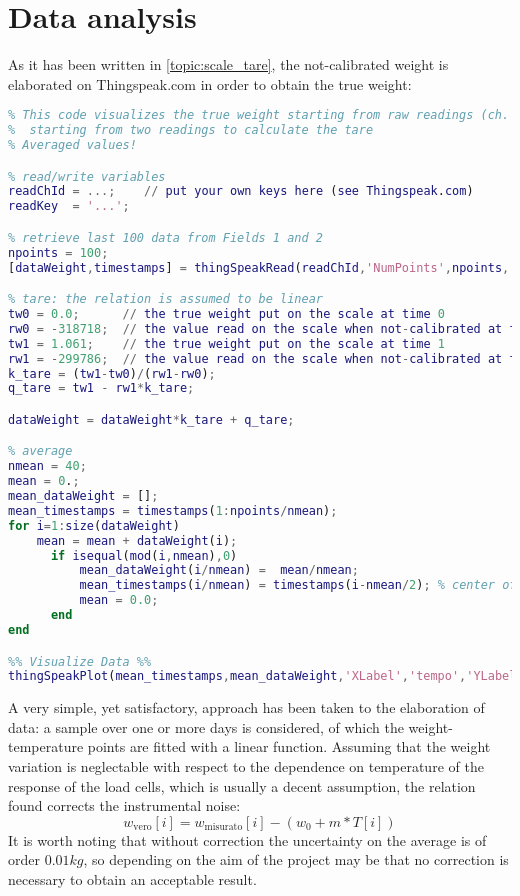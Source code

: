 \section{Data analysis}
As it has been written in \autoref{topic:scale_tare}, the not-calibrated weight is elaborated on Thingspeak.com in order to obtain the true weight:
 
\label{code:ts:tare}
\begin{lstlisting}[language=Matlab]
%%%%%%%%%%%%%%%%%%%%%%%
% This code visualizes the true weight starting from raw readings (ch. 4),
%  starting from two readings to calculate the tare
% Averaged values!

% read/write variables 
readChId = ...;    // put your own keys here (see Thingspeak.com)
readKey  = '...';

% retrieve last 100 data from Fields 1 and 2
npoints = 100;
[dataWeight,timestamps] = thingSpeakRead(readChId,'NumPoints',npoints,'Fields',4);

% tare: the relation is assumed to be linear
tw0 = 0.0;      // the true weight put on the scale at time 0
rw0 = -318718;  // the value read on the scale when not-calibrated at time 0 
tw1 = 1.061;    // the true weight put on the scale at time 1
rw1 = -299786;  // the value read on the scale when not-calibrated at time 0 
k_tare = (tw1-tw0)/(rw1-rw0);
q_tare = tw1 - rw1*k_tare;

dataWeight = dataWeight*k_tare + q_tare;

% average
nmean = 40;
mean = 0.;
mean_dataWeight = [];
mean_timestamps = timestamps(1:npoints/nmean);
for i=1:size(dataWeight)
    mean = mean + dataWeight(i);
      if isequal(mod(i,nmean),0)
          mean_dataWeight(i/nmean) =  mean/nmean;
          mean_timestamps(i/nmean) = timestamps(i-nmean/2); % center of interval
          mean = 0.0;
      end       
end

%% Visualize Data %%
thingSpeakPlot(mean_timestamps,mean_dataWeight,'XLabel','tempo','YLabel','peso (kg)','Title','Peso arnia','Legend',{'peso'});
\end{lstlisting}

A very simple, yet satisfactory, approach has been taken to the elaboration of data: a sample over one or more days is considered, of which the weight-temperature points are fitted with a linear function. Assuming that the weight variation is neglectable with respect to the dependence on temperature of the response of the load cells, which is usually a decent assumption, the relation found corrects the instrumental noise:
\[ w_{\mathrm{vero}}[i] = w_{\mathrm{misurato}}[i] - (w_0 + m*T[i]) \]
It is worth noting that without correction the uncertainty on the average is of order $0.01 kg$, so depending on the aim of the project may be that no correction is necessary to obtain an acceptable result. 

